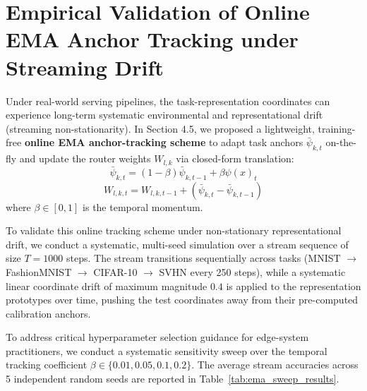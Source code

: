 \section{Empirical Validation of Online EMA Anchor Tracking under Streaming Drift}
\label{sec:ema_drift_validation}

Under real-world serving pipelines, the task-representation coordinates can experience long-term
systematic environmental and representational drift (streaming non-stationarity). In Section 4.5, we
proposed a lightweight, training-free \textbf{online EMA anchor-tracking scheme} to adapt task
anchors $\bar{\psi}_{k, t}$ on-the-fly and update the router weights $W_{l,k}$ via closed-form
translation:
\begin{equation}
\bar{\psi}_{k, t} = (1 - \beta) \bar{\psi}_{k, t-1} + \beta \psi(x)_t
\end{equation}
\begin{equation}
W_{l, k, t} = W_{l, k, t-1} + \left( \bar{\psi}_{k, t} - \bar{\psi}_{k, t-1} \right)
\end{equation}
where $\beta \in [0, 1]$ is the temporal momentum.

To validate this online tracking scheme under non-stationary representational drift, we conduct a
systematic, multi-seed simulation over a stream sequence of size $T=1000$ steps. The stream
transitions sequentially across tasks (MNIST $\to$ FashionMNIST $\to$ CIFAR-10 $\to$ SVHN every 250
steps), while a systematic linear coordinate drift of maximum magnitude $0.4$ is applied to the
representation prototypes over time, pushing the test coordinates away from their pre-computed
calibration anchors.

To address critical hyperparameter selection guidance for edge-system practitioners, we conduct a
systematic sensitivity sweep over the temporal tracking coefficient $\beta \in \{0.01, 0.05, 0.1,
0.2\}$. The average stream accuracies across 5 independent random seeds are reported in
Table~\ref{tab:ema_sweep_results}.


